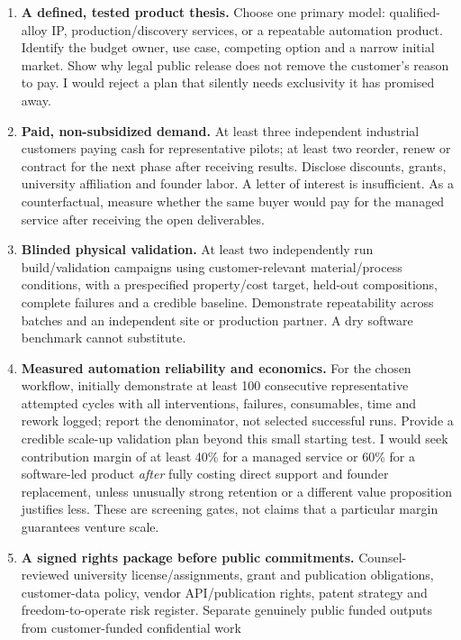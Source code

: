 \documentclass{article}
\begin{document}
\begin{enumerate}
\def\labelenumi{\arabic{enumi}.}
\tightlist
\item
  \textbf{A defined, tested product thesis.} Choose one primary model:
  qualified-alloy IP, production/discovery services, or a repeatable
  automation product. Identify the budget owner, use case, competing
  option and a narrow initial market. Show why legal public release does
  not remove the customer's reason to pay. I would reject a plan that
  silently needs exclusivity it has promised away.
\item
  \textbf{Paid, non-subsidized demand.} At least three independent
  industrial customers paying cash for representative pilots; at least
  two reorder, renew or contract for the next phase after receiving
  results. Disclose discounts, grants, university affiliation and
  founder labor. A letter of interest is insufficient. As a
  counterfactual, measure whether the same buyer would pay for the
  managed service after receiving the open deliverables.
\item
  \textbf{Blinded physical validation.} At least two independently run
  build/validation campaigns using customer-relevant material/process
  conditions, with a prespecified property/cost target, held-out
  compositions, complete failures and a credible baseline. Demonstrate
  repeatability across batches and an independent site or production
  partner. A dry software benchmark cannot substitute.
\item
  \textbf{Measured automation reliability and economics.} For the chosen
  workflow, initially demonstrate at least 100 consecutive
  representative attempted cycles with all interventions, failures,
  consumables, time and rework logged; report the denominator, not
  selected successful runs. Provide a credible scale-up validation plan
  beyond this small starting test. I would seek contribution margin of
  at least 40\% for a managed service or 60\% for a software-led product
  \emph{after} fully costing direct support and founder replacement,
  unless unusually strong retention or a different value proposition
  justifies less. These are screening gates, not claims that a
  particular margin guarantees venture scale.
\item
  \textbf{A signed rights package before public commitments.}
  Counsel-reviewed university license/assignments, grant and publication
  obligations, customer-data policy, vendor API/publication rights,
  patent strategy and freedom-to-operate risk register. Separate
  genuinely public funded outputs from customer-funded confidential work

\end{enumerate}
\end{document}
